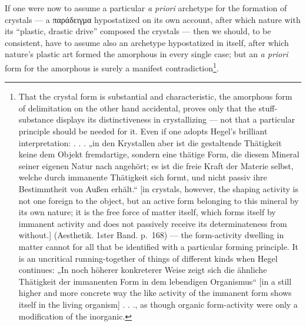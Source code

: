 \documentclass[12pt,a4paper]{book}
\begin{document}
If one were now to assume a particular \textit{a priori} archetype for the
formation of crystals --- a παράδειγμα hypostatized on its own account, after
which nature with its ``plastic, drastic drive'' composed the crystals --- then
we should, to be consistent, have to assume also an archetype hypostatized in
itself, after which nature's plastic art formed the amorphous in every single
case; but an \textit{a priori} form for the amorphous is surely a manifest
contradiction\footnote{That the crystal form is substantial and characteristic,
the amorphous form of delimitation on the other hand accidental, proves only
that the stuff-substance displays its distinctiveness in crystallizing --- not
that a particular principle should be needed for it. Even if one adopts Hegel's
brilliant interpretation: . . . „in den Krystallen aber ist
die gestaltende Thätigkeit keine dem Objekt fremdartige, sondern eine
thätige Form, die diesem Mineral seiner eigenen Natur nach angehört; es
ist die freie Kraft der Materie selbst, welche durch immanente
Thätigkeit sich formt, und nicht passiv ihre Bestimmtheit von Außen
erhält.“ [in crystals, however, the shaping activity is not one foreign to the
object, but an active form belonging to this mineral by its own nature; it is
the free force of matter itself, which forms itself by immanent activity and
does not passively receive its determinateness from without.] (Aesthetik.
1ster Band. p.~168) --- the form-activity dwelling in matter cannot for all
that be identified with a particular forming principle. It is an uncritical
running-together of things of different kinds when Hegel continues: „In noch
höherer konkreterer Weise zeigt sich die ähnliche Thätigkeit der immanenten
Form in dem lebendigen Organismus“ [in a still higher and more concrete way the
like activity of the immanent form shows itself in the living organism] . . .,
as though organic form-activity were only a modification of the inorganic.}.
\end{document}
